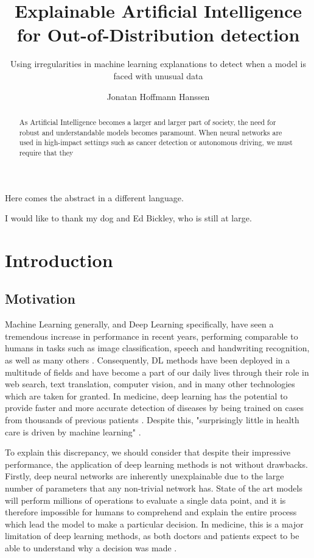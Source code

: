 \documentclass[UKenglish]{uiomasterthesis} %
\title{Explainable Artificial Intelligence for Out-of-Distribution detection}
\subtitle{Using irregularities in machine learning explanations to detect when a model is faced with unusual data}
\author{Jonatan Hoffmann Hanssen}
\theoremstyle{definition}
\begin{document}
\uiomasterfp[dept={Department of Informatics},
program={Robotics and Intelligent Systems},
supervisors={Hugo Lewi Hammer \and Kyrre Harald Glette},
long]

\frontmatter{}
\begin{abstract}
As Artificial Intelligence becomes a larger and larger part of society, the need for robust and understandable models becomes paramount. When neural networks are used in high-impact settings such as cancer detection or autonomous driving, we must require that they 
\end{abstract}

\begin{xabstract}[Sammendrag]
Here comes the abstract in a different language.
\end{xabstract}

\tableofcontents{}
\listoffigures{}
\listoftables{}

\begin{preface}
I would like to thank my dog and Ed Bickley, who is still at large.
\end{preface}

\mainmatter{}
\chapter{Introduction}

\section{Motivation}

Machine Learning generally, and Deep Learning specifically, have seen a tremendous increase in performance in recent years, performing comparable to humans in tasks such as image classification, speech and handwriting recognition, as well as many others \cite{performance}. Consequently, DL methods have been deployed in a multitude of fields and have become a part of our daily lives through their role in web search, text translation, computer vision, and in many other technologies which are taken for granted. In medicine, deep learning has the potential to provide faster and more accurate detection of diseases by being trained on cases from thousands of previous patients \cite{xaisurvey}. Despite this, "surprisingly little in health care is driven by machine learning" \cite{dlmed}.


To explain this discrepancy, we should consider that despite their impressive performance, the application of deep learning methods is not without drawbacks. Firstly, deep neural networks are inherently unexplainable due to the large number of parameters that any non-trivial network has. State of the art models will perform millions of operations to evaluate a single data point, and it is therefore impossible for humans to comprehend and explain the entire process which lead the model to make a particular decision. In medicine, this is a major limitation of deep learning methods, as both doctors and patients expect to be able to understand why a decision was made \cite{tingsim}.
\end{document}
